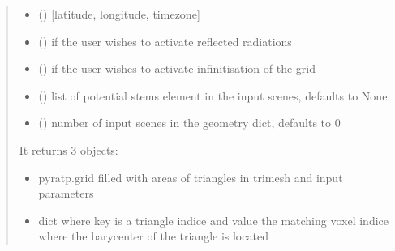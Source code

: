 \documentclass[letterpaper,10pt,english]{sphinxmanual}
\begin{document}
\begin{fulllineitems}
\begin{quote}
\begin{description}
\begin{itemize}
\item {} 
\sphinxAtStartPar
{} () \textendash{} {[}latitude, longitude, timezone{]}

\item {} 
\sphinxAtStartPar
{} () \textendash{} if the user wishes to activate reflected radiations

\item {} 
\sphinxAtStartPar
{} () \textendash{} if the user wishes to activate infinitisation of the grid

\item {} 
\sphinxAtStartPar
{} (\sphinxstyleliteralemphasis{\sphinxupquote{, }}) \textendash{} list of potential stems element in the input scenes, defaults to None

\item {} 
\sphinxAtStartPar
{} (\sphinxstyleliteralemphasis{\sphinxupquote{, }}) \textendash{} number of input scenes in the geometry dict, defaults to 0

\end{itemize}

\sphinxAtStartPar

\sphinxAtStartPar
It returns 3 objects:
\begin{itemize}
\item {} \begin{description}
\sphinxAtStartPar
pyratp.grid filled with areas of triangles in trimesh and input parameters

\end{description}

\item {} \begin{description}
\sphinxAtStartPar
dict where key is a triangle indice and value the matching voxel indice where the
barycenter of the triangle is located


\end{description}
\end{itemize}
\end{description}
\end{quote}
\end{fulllineitems}
\end{document}
